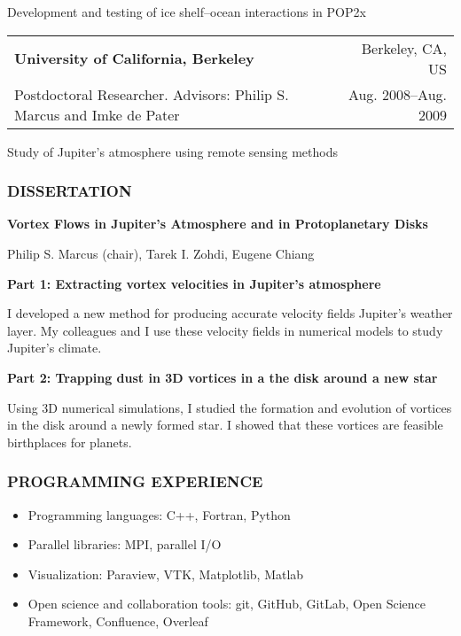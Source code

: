 \documentclass[12pt,letterpaper]{article}
\begin{document}
\begin{flushleft}
\vspace{4pt}

Development and testing of ice shelf--ocean interactions in POP2x
\vspace{10pt}

\begin{tabularx}{\textwidth}{@{} X r@{} }
{\bf University of California, Berkeley} & Berkeley, CA, US \\
Postdoctoral Researcher. Advisors: Philip S. Marcus and Imke de Pater &  Aug. 2008--Aug. 2009 
\end{tabularx}

\vspace{4pt}

Study of Jupiter's atmosphere using remote sensing methods

\subsubsection*{\color{titleBlue} DISSERTATION}

{\bf Vortex Flows in Jupiter's Atmosphere and in Protoplanetary Disks}

Philip S. Marcus (chair), Tarek I. Zohdi, Eugene Chiang

\vspace{5pt}

{\bf Part 1: Extracting vortex velocities in Jupiter's atmosphere }

I developed a new method for producing accurate velocity fields Jupiter's weather layer.  My colleagues and I use these velocity fields in numerical models to study Jupiter's climate.

\vspace{5pt}

{\bf Part 2: Trapping dust in 3D vortices in a the disk around a new star}

Using 3D numerical simulations, I studied the formation and evolution of vortices in the disk around a newly formed star.  I showed that these vortices are feasible birthplaces for planets.

\subsubsection*{\color{titleBlue} PROGRAMMING EXPERIENCE}

\begin{itemize}[noitemsep,nolistsep]
  \item Programming languages: C++, Fortran, Python
  \item Parallel libraries: MPI, parallel I/O
  \item Visualization: Paraview, VTK, Matplotlib, Matlab
  \item Open science and collaboration tools: git, GitHub, GitLab, Open Science Framework, Confluence, Overleaf
\end{itemize}


\end{flushleft}
\end{document}
